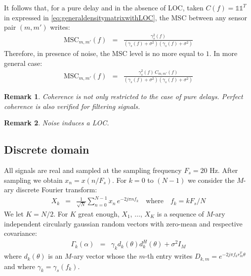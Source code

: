 \documentclass[a4paper, 12pt]{report}
\newcommand{\diag}[1]{\mathrm{diag}\left( #1 \right)}
\newtheorem{remark}{Remark}
\def\MSC{\mathrm{MSC}}
\begin{document}
\medskip
It follows that, for a pure delay and in the absence of LOC, taken $C(f)=\mathds{1}\mathds{1}^{T}$ in expressed in \eqref{eq:generaldensitymatrixwithLOC}, the MSC between any  sensor pair $(m,m')$ writes:
\begin{eqnarray*}
 \MSC_{m,m'}(f)&=& \frac{\gamma_{s}^{2}(f)}{(\gamma_{s}(f)+\sigma^{2})(\gamma_{s}(f)+\sigma^{2})}
\end{eqnarray*}
Therefore, in presence of noise, the MSC level is no more equal to $1$. In more general case:
\begin{eqnarray*}
 \MSC_{m,m'}(f)&=& \frac{\gamma_{s}^{2}(f)\, C_{m,m'}(f)}{(\gamma_{s}(f)+\sigma^{2})(\gamma_{s}(f)+\sigma^{2})}
\end{eqnarray*}



\begin{remark}
Coherence is not only restricted to the case of pure delays. Perfect coherence is also verified for filtering signals.
\end{remark}


\begin{remark}
Noise induces a LOC.
\end{remark}

\subsection{Discrete domain}

All signals are real and sampled at the sampling frequency  $F_{s}=20$ Hz. After sampling we obtain $x_{n}=x(n/F_{s})$. For $k=0$ to $(N-1)$ we consider the $M$-ary discrete Fourier transform:
 \begin{eqnarray*}
 X_{k}&=&\frac{1}{\sqrt{N}}\sum_{n=0}^{N-1}x_{n}\,e^{-2j\pi n f_{k}}
    \quad\mathrm{where}\quad
 f_{k}=kF_{s}/N
 \end{eqnarray*}
We let $K=N/2$.
For $K$ great enough, $X_{1}$, $\ldots$, $X_{K}$ is a sequence of  $M$-ary independent circularly gaussian random vectors with zero-mean and respective covariance:
\begin{eqnarray}
\label{eq:spectralmatrixpuredelay}
\Gamma_{k}(\alpha)&=&\gamma_{k}d_{k}(\theta)d_{k}^{H}(\theta)+\sigma^{2}I_{M}
\end{eqnarray}
where $d_{k}(\theta)$ is an $M$-ary vector whose the $m$-th entry writes $D_{k,m}=e^{-2j\pi f_{k} r_{m}^{T}\theta }$ and where $\gamma_{k}=\gamma_{s}(f_{k})$.
\end{document}
